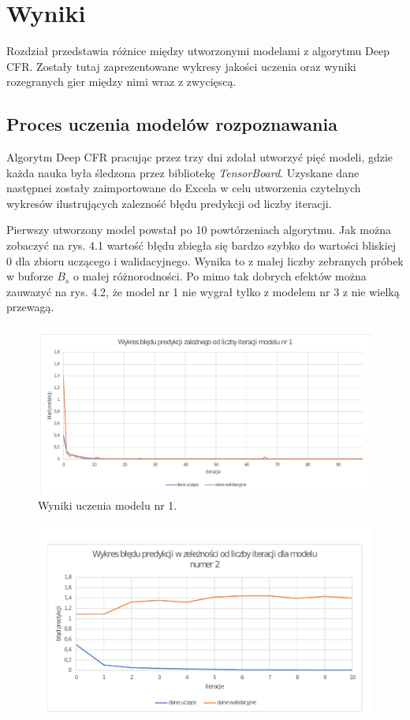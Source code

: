 \documentclass[12pt,oneside,a4paper]{report}
\begin{document}
\chapter{Wyniki}

Rozdział przedstawia różnice między utworzonymi modelami z algorytmu Deep CFR. Zostały tutaj
zaprezentowane wykresy jakości uczenia oraz wyniki rozegranych gier między nimi wraz z zwycięscą.


\section{Proces uczenia modelów rozpoznawania}

Algorytm Deep CFR pracując przez trzy dni zdołał utworzyć pięć modeli, gdzie każda nauka była
śledzona przez bibliotekę \emph{TensorBoard}. Uzyskane dane następnei zostały zaimportowane do
Excela w celu utworzenia czytelnych wykresów ilustrujących zalezność błędu predykcji od liczby
iteracji.

Pierwszy utworzony model powstał po 10 powtórzeniach algorytmu. Jak można zobaczyć na rys. 4.1
wartość błędu
zbiegła się bardzo szybko do wartości bliskiej 0 dla zbioru uczącego i walidacyjnego. Wynika to z 
małej liczby zebranych próbek w buforze $B_{s}$ o małej różnorodności. Po mimo tak dobrych efektów
można zauwazyć na rys. 4.2, że model nr 1 nie wygrał tylko z modelem nr 3 z nie wielką przewagą.

\begin{figure}[!ht]
  \centering
  \includegraphics[width=1\textwidth]{./img/model1.pdf}
\caption{Wyniki uczenia modelu nr 1.}
\end{figure}

\begin{figure}[!ht]
  \centering
  \includegraphics[width=1\textwidth]{./img/model2.pdf}
\end{figure}
\end{document}
